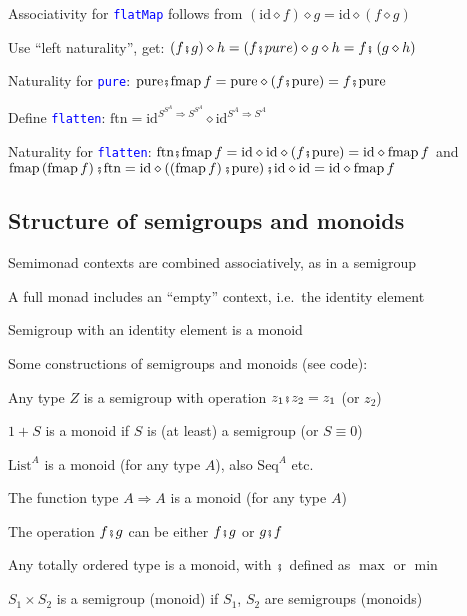 Associativity for \texttt{\textcolor{blue}{\footnotesize{}flatMap}}
follows from $\left(\text{id}\diamond f\right)\diamond g=\text{id}\diamond\left(f\diamond g\right)$

Use ``left naturality'', get: $\left(f\bef g\right)\diamond h=\left(f\bef pure\right)\diamond g\diamond h=f\bef\left(g\diamond h\right)$

Naturality for \texttt{\textcolor{blue}{\footnotesize{}pure}}: $\text{pure}\bef\text{fmap}\,f=\text{pure}\diamond\left(f\bef\text{pure}\right)=f\bef\text{pure}$

Define \texttt{\textcolor{blue}{\footnotesize{}flatten}}: $\text{ftn}=\text{id}^{S^{S^{A}}\Rightarrow S^{S^{A}}}\diamond\text{id}^{S^{A}\Rightarrow S^{A}}$

Naturality for \texttt{\textcolor{blue}{\footnotesize{}flatten}}:
$\text{ftn}\bef\text{fmap}\,f=\text{id}\diamond\text{id}\diamond\left(f\bef\text{pure}\right)=\text{id}\diamond\text{fmap}\,f$
and $\text{fmap}\left(\text{fmap}\,f\right)\bef\text{ftn}=\text{id}\diamond\left(\left(\text{fmap}\,f\right)\bef\text{pure}\right)\bef\text{id}\diamond\text{id}=\text{id}\diamond\text{fmap}\,f$


\subsection{Structure of semigroups and monoids}

Semimonad contexts are combined associatively, as in a semigroup

A full monad includes an ``empty'' context, i.e.\ the identity
element

Semigroup with an identity element is a monoid

Some constructions of semigroups and monoids (see code):

Any type $Z$ is a semigroup with operation $z_{1}\bef z_{2}=z_{1}$
(or $z_{2}$)

$1+S$ is a monoid if $S$ is (at least) a semigroup (or $S\equiv0$)

$\text{List}^{A}$ is a monoid (for any type $A$), also $\text{Seq}^{A}$
etc.

The function type $A\Rightarrow A$ is a monoid (for any type $A$)

The operation $f\bef g$ can be either $f\bef g$ or $g\bef f$

Any totally ordered type is a monoid, with $\bef$ defined as $\max$
or $\min$

$S_{1}\times S_{2}$ is a semigroup (monoid) if $S_{1}$, $S_{2}$
are semigroups (monoids)

